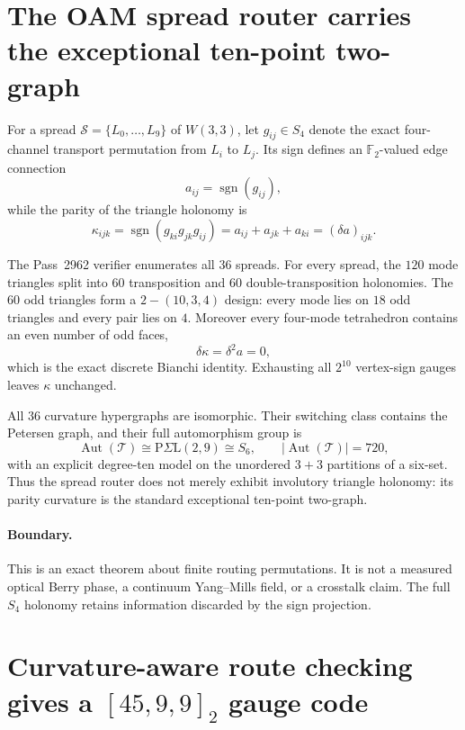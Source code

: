 \section{The OAM spread router carries the exceptional ten-point two-graph}
\label{sec:bt2962-oam-two-graph}

For a spread \(\mathcal S=\{L_0,\ldots,L_9\}\) of \(W(3,3)\), let
\(g_{ij}\in S_4\) denote the exact four-channel transport permutation from
\(L_i\) to \(L_j\).  Its sign defines an \(\mathbb F_2\)-valued edge
connection
\[
 a_{ij}=\operatorname{sgn}(g_{ij}),
\]
while the parity of the triangle holonomy is
\[
 \kappa_{ijk}
 =\operatorname{sgn}(g_{ki}g_{jk}g_{ij})
 =a_{ij}+a_{jk}+a_{ki}
 =(\delta a)_{ijk}.
\]

The Pass~2962 verifier enumerates all \(36\) spreads.  For every spread, the
\(120\) mode triangles split into \(60\) transposition and \(60\)
double-transposition holonomies.  The \(60\) odd triangles form a
\(2-(10,3,4)\) design: every mode lies on \(18\) odd triangles and every pair
lies on \(4\).  Moreover every four-mode tetrahedron contains an even number
of odd faces,
\[
 \delta\kappa=\delta^2a=0,
\]
which is the exact discrete Bianchi identity.  Exhausting all \(2^{10}\)
vertex-sign gauges leaves \(\kappa\) unchanged.

All \(36\) curvature hypergraphs are isomorphic.  Their switching class
contains the Petersen graph, and their full automorphism group is
\[
 \operatorname{Aut}(\mathcal T)
 \cong \mathrm{P}\Sigma\mathrm L(2,9)
 \cong S_6,
 \qquad |\operatorname{Aut}(\mathcal T)|=720,
\]
with an explicit degree-ten model on the unordered \(3+3\) partitions of a
six-set.  Thus the spread router does not merely exhibit involutory triangle
holonomy: its parity curvature is the standard exceptional ten-point
two-graph.

\paragraph{Boundary.}
This is an exact theorem about finite routing permutations.  It is not a
measured optical Berry phase, a continuum Yang--Mills field, or a crosstalk
claim.  The full \(S_4\) holonomy retains information discarded by the sign
projection.

\section{Curvature-aware route checking gives a \([45,9,9]_2\) gauge code}
\label{sec:bt2965-curvature-route-code}

